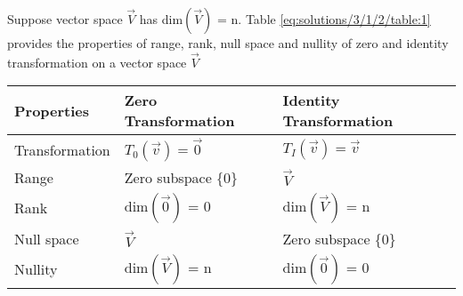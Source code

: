 
Suppose vector space $\vec{V}$ has dim$(\vec{V})$ = n. Table \ref{eq:solutions/3/1/2/table:1} provides the properties of range, rank, null space and nullity of zero and identity transformation on a vector space $\vec{V}$
\begin{table*}[ht!]
\begin{center}
\begin{tabular}{|l|l|l|}
\hline

\textbf{Properties} & \textbf{Zero Transformation} & \textbf{Identity Transformation} \\[1ex]
\hline

Transformation & $T_0(\vec{v}) = \vec{0}$ & $T_I(\vec{v}) = \vec{v}$ \\[0.5ex] 
\hline

Range & Zero subspace \{0\} & $\vec{V}$\\[0.5ex] 
\hline

Rank & dim$(\vec{0})$ = 0 & dim$(\vec{V})$ = n \\[0.5ex]
\hline

Null space & $\vec{V}$ & Zero subspace \{0\} \\[0.5ex]
\hline

Nullity & dim$(\vec{V})$ = n & dim$(\vec{0})$ = 0 \\ [0.5ex] 
\hline
\end{tabular}
\caption{Properties of Zero and Identity transformation}
\label{eq:solutions/3/1/2/table:1}
\end{center}
\vspace{-0.5cm}
\end{table*}

